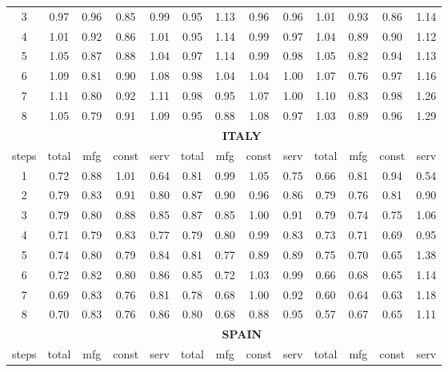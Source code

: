 \documentclass[11pt]{article}
\begin{document}
\begin{appendices}
\begin{table}[htbp]
\begin{tabular}{c|cccc|cccc|cccc}
    3     & 0.97  & 0.96  & 0.85  & 0.99  & 0.95  & 1.13  & 0.96  & 0.96  & 1.01  & 0.93  & 0.86  & 1.14 \\
    4     & 1.01  & 0.92  & 0.86  & 1.01  & 0.95  & 1.14  & 0.99  & 0.97  & 1.04  & 0.89  & 0.90  & 1.12 \\
    5     & 1.05  & 0.87  & 0.88  & 1.04  & 0.97  & 1.14  & 0.99  & 0.98  & 1.05  & 0.82  & 0.94  & 1.13 \\
    6     & 1.09  & 0.81  & 0.90  & 1.08  & 0.98  & 1.04  & 1.04  & 1.00  & 1.07  & 0.76  & 0.97  & 1.16 \\
    7     & 1.11  & 0.80  & 0.92  & 1.11  & 0.98  & 0.95  & 1.07  & 1.00  & 1.10  & 0.83  & 0.98  & 1.26 \\
    8     & 1.05  & 0.79  & 0.91  & 1.09  & 0.95  & 0.88  & 1.08  & 0.97  & 1.03  & 0.89  & 0.96  & 1.29 \\
    \midrule
    \multicolumn{1}{c}{} & \multicolumn{12}{c}{\textbf{ITALY}} \\
    \midrule
    steps & total & mfg   & const & serv  & total & mfg   & const & serv  & total & mfg   & const & serv \\
    \midrule
    1     & 0.72  & 0.88  & 1.01  & 0.64  & 0.81  & 0.99  & 1.05  & 0.75  & 0.66  & 0.81  & 0.94  & 0.54 \\
    2     & 0.79  & 0.83  & 0.91  & 0.80  & 0.87  & 0.90  & 0.96  & 0.86  & 0.79  & 0.76  & 0.81  & 0.90 \\
    3     & 0.79  & 0.80  & 0.88  & 0.85  & 0.87  & 0.85  & 1.00  & 0.91  & 0.79  & 0.74  & 0.75  & 1.06 \\
    4     & 0.71  & 0.79  & 0.83  & 0.77  & 0.79  & 0.80  & 0.99  & 0.83  & 0.73  & 0.71  & 0.69  & 0.95 \\
    5     & 0.74  & 0.80  & 0.79  & 0.84  & 0.81  & 0.77  & 0.89  & 0.89  & 0.75  & 0.70  & 0.65  & 1.38 \\
    6     & 0.72  & 0.82  & 0.80  & 0.86  & 0.85  & 0.72  & 1.03  & 0.99  & 0.66  & 0.68  & 0.65  & 1.14 \\
    7     & 0.69  & 0.83  & 0.76  & 0.81  & 0.78  & 0.68  & 1.00  & 0.92  & 0.60  & 0.64  & 0.63  & 1.18 \\
    8     & 0.70  & 0.83  & 0.76  & 0.86  & 0.80  & 0.68  & 0.88  & 0.95  & 0.57  & 0.67  & 0.65  & 1.11 \\
    \midrule
    \multicolumn{1}{c}{} & \multicolumn{12}{c}{\textbf{SPAIN}} \\
    \midrule
    steps & total & mfg   & const & serv  & total & mfg   & const & serv  & total & mfg   & const & serv \\

\end{tabular}
\end{table}
\end{appendices}
\end{document}
